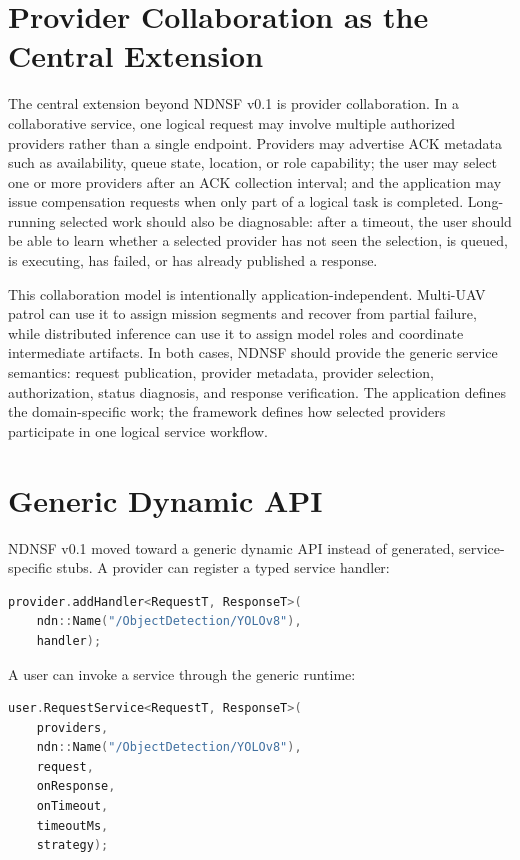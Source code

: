 \section{Provider Collaboration as the Central Extension}

The central extension beyond NDNSF v0.1 is provider collaboration. In a
collaborative service, one logical request may involve multiple authorized
providers rather than a single endpoint. Providers may advertise ACK metadata
such as availability, queue state, location, or role capability; the user may
select one or more providers after an ACK collection interval; and the
application may issue compensation requests when only part of a logical task
is completed. Long-running selected work should also be diagnosable: after a
timeout, the user should be able to learn whether a selected provider has not
seen the selection, is queued, is executing, has failed, or has already
published a response.

This collaboration model is intentionally application-independent. Multi-UAV
patrol can use it to assign mission segments and recover from partial failure,
while distributed inference can use it to assign model roles and coordinate
intermediate artifacts. In both cases, NDNSF should provide the generic service
semantics: request publication, provider metadata, provider selection,
authorization, status diagnosis, and response verification. The application
defines the domain-specific work; the framework defines how selected providers
participate in one logical service workflow.

\section{Generic Dynamic API}

NDNSF v0.1 moved toward a generic dynamic API instead of generated,
service-specific stubs. A provider can register a typed service handler:

\begin{lstlisting}[language=C++]
provider.addHandler<RequestT, ResponseT>(
    ndn::Name("/ObjectDetection/YOLOv8"),
    handler);
\end{lstlisting}

A user can invoke a service through the generic runtime:

\begin{lstlisting}[language=C++]
user.RequestService<RequestT, ResponseT>(
    providers,
    ndn::Name("/ObjectDetection/YOLOv8"),
    request,
    onResponse,
    onTimeout,
    timeoutMs,
    strategy);
\end{lstlisting}

